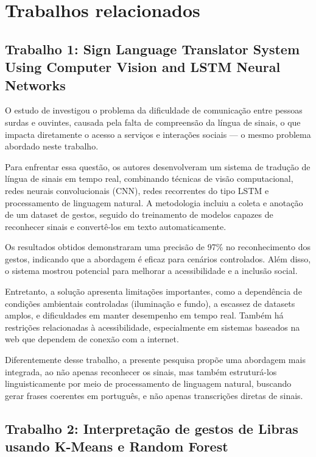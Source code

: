 \documentclass[
    12pt,                %
    openright,           %
    oneside,             %
    a4paper,             %
    english,             %
    brazil               %
]{abntex2}
\begin{document}
\section{Trabalhos relacionados}
\label{sec:trabalhos_relacionados}

\subsection{Trabalho 1: Sign Language Translator System Using Computer Vision and LSTM Neural Networks}

O estudo de  investigou o problema da dificuldade de comunicação entre pessoas surdas e ouvintes, causada pela falta de compreensão da língua de sinais, o que impacta diretamente o acesso a serviços e interações sociais — o mesmo problema abordado neste trabalho.

Para enfrentar essa questão, os autores desenvolveram um sistema de tradução de língua de sinais em tempo real, combinando técnicas de visão computacional, redes neurais convolucionais (CNN), redes recorrentes do tipo LSTM e processamento de linguagem natural. A metodologia incluiu a coleta e anotação de um dataset de gestos, seguido do treinamento de modelos capazes de reconhecer sinais e convertê-los em texto automaticamente.

Os resultados obtidos demonstraram uma precisão de 97\% no reconhecimento dos gestos, indicando que a abordagem é eficaz para cenários controlados. Além disso, o sistema mostrou potencial para melhorar a acessibilidade e a inclusão social.

Entretanto, a solução apresenta limitações importantes, como a dependência de condições ambientais controladas (iluminação e fundo), a escassez de datasets amplos, e dificuldades em manter desempenho em tempo real. Também há restrições relacionadas à acessibilidade, especialmente em sistemas baseados na web que dependem de conexão com a internet.

Diferentemente desse trabalho, a presente pesquisa propõe uma abordagem mais integrada, ao não apenas reconhecer os sinais, mas também estruturá-los linguisticamente por meio de processamento de linguagem natural, buscando gerar frases coerentes em português, e não apenas transcrições diretas de sinais.

\subsection{Trabalho 2: Interpretação de gestos de Libras usando K-Means e Random Forest}
\end{document}
